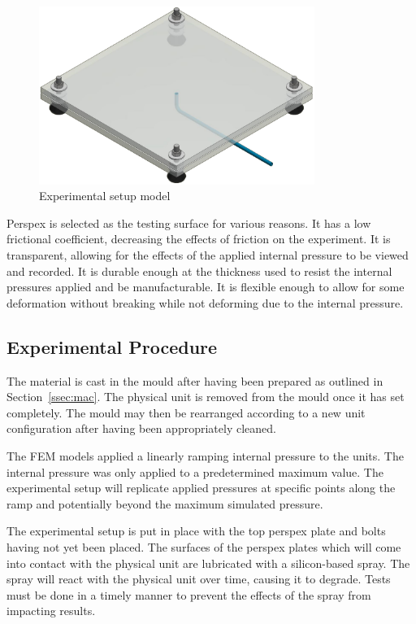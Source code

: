 \begin{figure}[H]
	\centering
	\includegraphics[width=0.8\textwidth]{ER.png}
	\caption{Experimental setup model}
	\label{fig:exp}
\end{figure}

Perspex is selected as the testing surface for various reasons. It has a low frictional coefficient, decreasing the effects of friction on the experiment. It is transparent, allowing for the effects of the applied internal pressure to be viewed and recorded. It is durable enough at the thickness used to resist the internal pressures applied and be manufacturable. It is flexible enough to allow for some deformation without breaking while not deforming due to the internal pressure.

\subsection{Experimental Procedure}
\label{ssec:ep}

The material is cast in the mould after having been prepared as outlined in Section~\ref{ssec:mac}. The physical unit is removed from the mould once it has set completely. The mould may then be rearranged according to a new unit configuration after having been appropriately cleaned.

The FEM models applied a linearly ramping internal pressure to the units. The internal pressure was only applied to a predetermined maximum value. The experimental setup will replicate applied pressures at specific points along the ramp and potentially beyond the maximum simulated pressure.

The experimental setup is put in place with the top perspex plate and bolts having not yet been placed. The surfaces of the perspex plates which will come into contact with the physical unit are lubricated with a silicon-based spray. The spray will react with the physical unit over time, causing it to degrade. Tests must be done in a timely manner to prevent the effects of the spray from impacting results.

